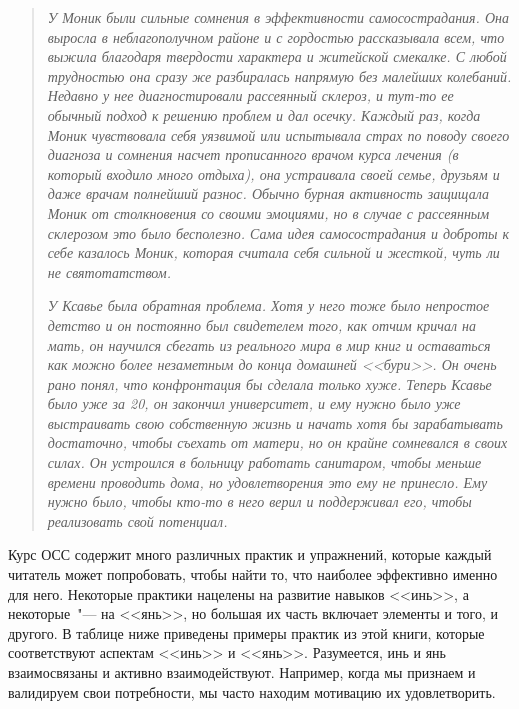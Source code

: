 \begin{quotation}
	\textit{У Моник были сильные сомнения в эффективности самосострадания. Она выросла в неблагополучном районе и с гордостью рассказывала всем, что выжила благодаря твердости характера и житейской смекалке. С любой трудностью она сразу же разбиралась напрямую без малейших колебаний. Недавно у нее диагностировали рассеянный склероз, и тут-то ее обычный подход к решению проблем и дал осечку.  Каждый раз, когда Моник чувствовала себя уязвимой или испытывала страх по поводу своего диагноза и сомнения насчет прописанного врачом курса лечения (в который входило много отдыха), она устраивала своей семье, друзьям и даже врачам полнейший разнос. Обычно бурная активность защищала Моник от столкновения со своими эмоциями, но в случае с рассеянным склерозом это было бесполезно. Сама идея самосострадания и доброты к себе казалось Моник, которая считала себя сильной и жесткой, чуть ли не святотатством.}  
	
	\textit{У Ксавье была обратная проблема. Хотя у него тоже было непростое детство и он постоянно был свидетелем того, как отчим кричал на мать, он научился сбегать из реального мира в мир книг и оставаться как можно более незаметным до конца домашней <<бури>>. Он очень рано понял, что конфронтация бы сделала только хуже. Теперь Ксавье было уже за 20, он закончил университет, и ему нужно было уже выстраивать свою собственную жизнь и начать хотя бы зарабатывать достаточно, чтобы съехать от матери, но он крайне сомневался в своих силах. Он устроился в больницу работать санитаром, чтобы меньше времени проводить дома, но удовлетворения это ему не принесло. Ему нужно было, чтобы кто-то в него верил и поддерживал его, чтобы реализовать свой потенциал.} 
\end{quotation}

Курс ОСС содержит много различных практик и упражнений, которые каждый читатель может попробовать, чтобы найти то, что наиболее эффективно именно для него. Некоторые практики нацелены на развитие навыков <<инь>>, а некоторые~"--- на <<янь>>, но большая их часть включает элементы и того, и другого. В таблице ниже приведены примеры практик из этой книги, которые соответствуют аспектам <<инь>> и <<янь>>. Разумеется, инь и янь взаимосвязаны и активно взаимодействуют. Например, когда мы признаем и валидируем свои потребности, мы часто находим мотивацию их удовлетворить.

